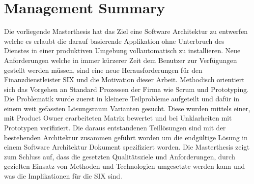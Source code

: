 \chapter{Management Summary}

Die vorliegende Masterthesis hat das Ziel eine Software Architektur zu entwerfen welche es erlaubt die darauf basierende Applikation ohne Unterbruch des Dienstes in einer produktiven Umgebung vollautomatisch zu installieren.\newline\newline
Neue Anforderungen welche in immer kürzerer Zeit dem Benutzer zur Verfügungen gestellt werden müssen, sind eine neue Herausforderungen für den Finanzdienstleister SIX und die Motivation dieser Arbeit.\newline\newline
Methodisch orientiert sich das Vorgehen an Standard Prozessen der Firma wie Scrum und Prototyping. Die Problematik wurde zuerst in kleinere Teilprobleme aufgeteilt und dafür in einem weit gefassten Lösungsraum Varianten gesucht. Diese wurden mittels einer, mit Product Owner erarbeiteten Matrix bewertet und bei Unklarheiten mit Prototypen verifiziert. Die daraus entstandenen Teillösungen sind mit der bestehenden Architektur zusammen geführt worden um die endgültige Lösung in einem Software Architektur Dokument spezifiziert worden.\newline\newline
Die Masterthesis zeigt zum Schluss auf, dass die gesetzten Qualitätsziele und Anforderungen, durch gezielten Einsatz von Methoden und Technologien umgesetzte werden kann und was die Implikationen für die SIX sind.